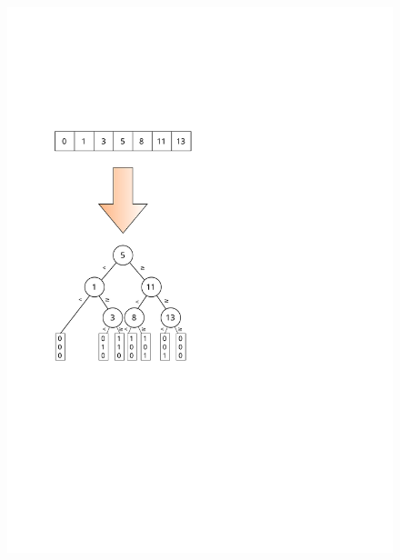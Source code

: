 \documentclass[xcolor=x11names,compress]{beamer}
\renewcommand{\(}{\begin{columns}}
\renewcommand{\)}{\end{columns}}
\newcommand{\<}[1]{\begin{column}{#1}}
\renewcommand{\>}{\end{column}}
\begin{document}
\begin{frame}
  \begin{figure}
  \centering
  \includegraphics[scale=0.6]{figures/array_to_tree}
  \end{figure}
\end{frame}

\end{document}
